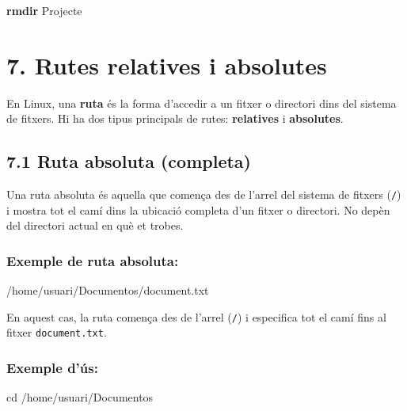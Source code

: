 \documentclass[
  12 pt,
  a4paper,
]{article}
\newenvironment{Shaded}{\begin{snugshade}}{\end{snugshade}}
\newcommand{\BuiltInTok}[1]{#1}
\newcommand{\ExtensionTok}[1]{#1}
\newcommand{\FunctionTok}[1]{\textcolor[rgb]{0.13,0.29,0.53}{\textbf{#1}}}
\newcommand{\NormalTok}[1]{#1}
\begin{document}
\begin{Shaded}
\begin{Highlighting}[]
\FunctionTok{rmdir}\NormalTok{ Projecte}
\end{Highlighting}
\end{Shaded}

\section{7. Rutes relatives i
absolutes}\label{rutes-relatives-i-absolutes}

En Linux, una \textbf{ruta} és la forma d'accedir a un fitxer o
directori dins del sistema de fitxers. Hi ha dos tipus principals de
rutes: \textbf{relatives} i \textbf{absolutes}.

\subsection{7.1 Ruta absoluta (completa)}\label{ruta-absoluta-completa}

Una ruta absoluta és aquella que comença des de l'arrel del sistema de
fitxers (\texttt{/}) i mostra tot el camí dins la ubicació completa d'un
fitxer o directori. No depèn del directori actual en què et trobes.

\subsubsection{Exemple de ruta
absoluta:}\label{exemple-de-ruta-absoluta}

\begin{Shaded}
\begin{Highlighting}[]
\ExtensionTok{/home/usuari/Documentos/document.txt}
\end{Highlighting}
\end{Shaded}

En aquest cas, la ruta comença des de l'arrel (\texttt{/}) i especifica
tot el camí fins al fitxer \texttt{document.txt}.

\subsubsection{Exemple d'ús:}\label{exemple-duxfas}

\begin{Shaded}
\begin{Highlighting}[]
\BuiltInTok{cd}\NormalTok{ /home/usuari/Documentos}
\end{Highlighting}
\end{Shaded}
\end{document}
